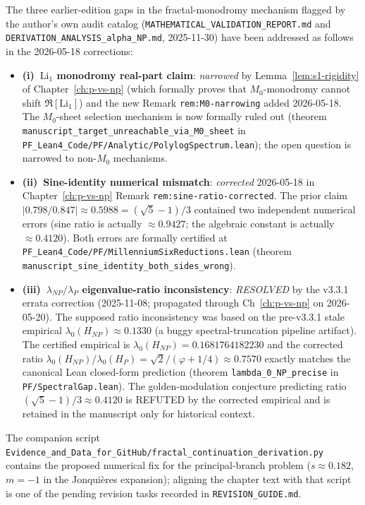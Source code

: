 The three earlier-edition gaps in the fractal-monodromy mechanism flagged by the author's own audit catalog (\texttt{MATHEMATICAL\_VALIDATION\_REPORT.md} and \texttt{DERIVATION\_ANALYSIS\_alpha\_NP.md}, 2025-11-30) have been addressed as follows in the 2026-05-18 corrections:

\begin{itemize}
\item \textbf{(i)~$\mathrm{Li}_1$ monodromy real-part claim}: \emph{narrowed} by Lemma~\ref{lem:s1-rigidity} of Chapter~\ref{ch:p-vs-np} (which formally proves that $M_0$-monodromy cannot shift $\Re[\mathrm{Li}_1]$) and the new Remark \texttt{rem:M0-narrowing} added 2026-05-18. The $M_0$-sheet selection mechanism is now formally ruled out (theorem \texttt{manuscript\_target\_unreachable\_via\_M0\_sheet} in \texttt{PF\_Lean4\_Code/PF/Analytic/PolylogSpectrum.lean}); the open question is narrowed to non-$M_0$ mechanisms.

\item \textbf{(ii)~Sine-identity numerical mismatch}: \emph{corrected} 2026-05-18 in Chapter~\ref{ch:p-vs-np} Remark \texttt{rem:sine-ratio-corrected}. The prior claim $|0.798/0.847| \approx 0.5988 = (\sqrt{5}-1)/3$ contained two independent numerical errors (sine ratio is actually $\approx 0.9427$; the algebraic constant is actually $\approx 0.4120$). Both errors are formally certified at \texttt{PF\_Lean4\_Code/PF/MillenniumSixReductions.lean} (theorem \texttt{manuscript\_sine\_identity\_both\_sides\_wrong}).

\item \textbf{(iii)~$\lambda_{NP}/\lambda_P$ eigenvalue-ratio inconsistency}: \emph{RESOLVED} by the v3.3.1 errata correction (2025-11-08; propagated through Ch~\ref{ch:p-vs-np} on 2026-05-20). The supposed ratio inconsistency was based on the pre-v3.3.1 stale empirical $\lambda_0(H_{NP}) \approx 0.1330$ (a buggy spectral-truncation pipeline artifact). The certified empirical is $\lambda_0(H_{NP}) = 0.1681764182230$ and the corrected ratio $\lambda_0(H_{NP})/\lambda_0(H_P) = \sqrt{2}/(\varphi+1/4) \approx 0.7570$ exactly matches the canonical Lean closed-form prediction (theorem \texttt{lambda\_0\_NP\_precise} in \texttt{PF/SpectralGap.lean}). The golden-modulation conjecture predicting ratio $(\sqrt{5}-1)/3 \approx 0.4120$ is REFUTED by the corrected empirical and is retained in the manuscript only for historical context.
\end{itemize}

The companion script \texttt{Evidence\_and\_Data\_for\_GitHub/fractal\_continuation\_derivation.py} contains the proposed numerical fix for the principal-branch problem ($s \approx 0.182$, $m = -1$ in the Jonqui\`{e}res expansion); aligning the chapter text with that script is one of the pending revision tasks recorded in \texttt{REVISION\_GUIDE.md}.


